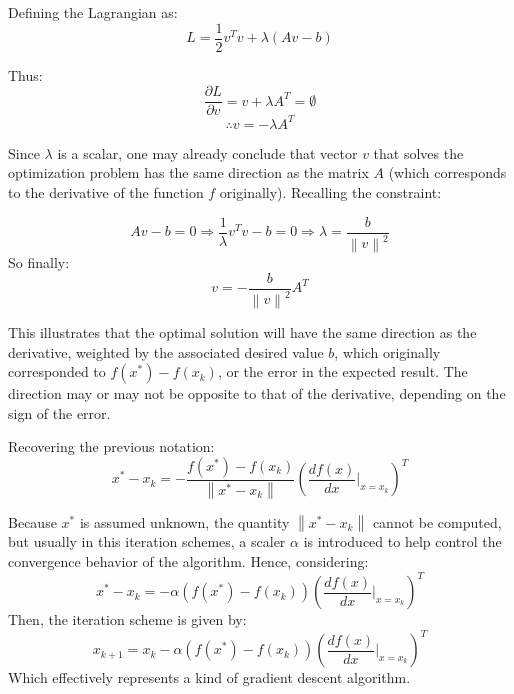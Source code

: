 \documentclass[10pt,journal,compsoc]{IEEEtran}
\newcommand{\norm}[1]{\left\lVert#1\right\rVert}
\newcommand{\pd}[2]{\frac{\partial #1}{\partial #2}}
\begin{document}
Defining the Lagrangian as:
\begin{equation}
	L = \frac{1}{2} v^Tv + \lambda (Av-b)
\end{equation} 

Thus:
\begin{equation}
	\pd{L}{v} = v + \lambda A^T = \emptyset
\end{equation} 
\begin{equation}
	\therefore v = - \lambda A^T 
\end{equation} 

Since $\lambda$ is a scalar, one may already conclude that vector $v$ that solves the optimization problem has the same direction as the matrix $A$ (which corresponds to the derivative of the function $f$ originally). Recalling the constraint:

\begin{equation}
	Av-b = 0 \Rightarrow \frac{1}{\lambda} v^Tv - b = 0\Rightarrow \lambda = \frac{b}{\norm{v}^2}
\end{equation} 
So finally:
\begin{equation}
	v = -\frac{b}{\norm{v}^2} A^T
\end{equation} 

This illustrates that the optimal solution will have the same direction as the derivative, weighted by the associated desired value $b$, which originally corresponded to $f(x^*) - f(x_k)$, or the error in the expected result. The direction may or may not be opposite to that of the derivative, depending on the sign of the error.

Recovering the previous notation:
\begin{equation}
	x^*-x_k = -\frac{f(x^*)-f(x_k)}{\norm{x^*-x_k}} \left( \frac{df(x)}{dx}|_{x=x_k}\right)^T
\end{equation} 

Because $x^*$ is assumed unknown, the quantity $\norm{x^*-x_k}$ cannot be computed, but usually in this iteration schemes, a scaler $\alpha$ is introduced to help control the convergence behavior of the algorithm. Hence, considering:
\begin{equation}
	x^*-x_k = -\alpha \left(f(x^*)-f(x_k)\right) \left( \frac{df(x)}{dx}|_{x=x_k}\right)^T
\end{equation}
Then, the iteration scheme is given by:
\begin{equation} \label{eq:over_iter}
	x_{k+1} = x_k -\alpha \left(f(x^*)-f(x_k)\right) \left( \frac{df(x)}{dx}|_{x=x_k}\right)^T
\end{equation}
Which effectively represents a kind of gradient descent algorithm.
\end{document}
